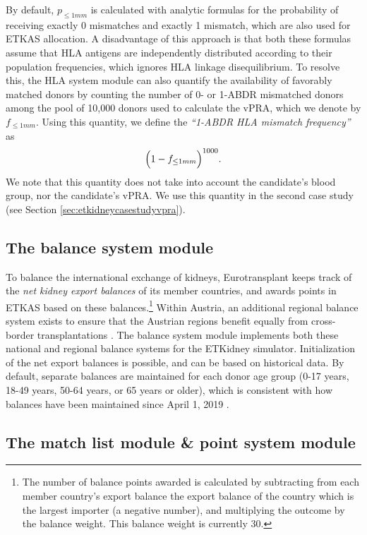 \documentclass[11pt,twoside,]{book}
\let\rmarkdownfootnote\footnote%
\def\footnote{\protect\rmarkdownfootnote}
\begin{document}
By default, \(p_{\leq1mm}\) is calculated with analytic formulas for the probability of
receiving exactly 0 mismatches and exactly 1 mismatch, which are also used for ETKAS
allocation. A disadvantage of this approach is that both these formulas assume
that HLA antigens are independently distributed according to their population
frequencies, which ignores HLA linkage disequilibrium. To resolve this, the
HLA system module can also quantify the availability of favorably matched donors
by counting the number of 0- or 1-ABDR mismatched donors among the pool of 10,000
donors used to calculate the vPRA, which we denote by \(f_{\leq1mm}\). Using this
quantity, we define the \emph{``1-ABDR HLA mismatch frequency''} as
\[\Bigl(1- f_{\leq1mm}\Bigr)^{1000}.\] We note that this quantity does not
take into account the candidate's blood group, nor the candidate's vPRA.
We use this quantity in the second case study (see Section
\ref{sec:etkidneycasestudyvpra}).

\subsection{The balance system module}\label{sec:etkidneybalance}

To balance the international exchange of kidneys, Eurotransplant keeps track of
the \emph{net kidney export balances} of its member countries, and awards points in
ETKAS based on these balances.\footnote{The number of balance points awarded is calculated
  by subtracting from each member country's export balance the export balance of
  the country which is the largest importer (a negative number), and multiplying
  the outcome by the balance weight. This balance weight is currently 30.} Within Austria, an additional regional balance system
exists to ensure that the Austrian regions benefit equally from
cross-border transplantations \citep{manualKidney}. The balance system module
implements both these national and regional balance systems for the ETKidney
simulator. Initialization of the net export balances is possible, and can be based on
historical data. By default, separate balances are maintained for each donor
age group (0-17 years, 18-49 years, 50-64 years, or 65 years or older), which
is consistent with how balances have been maintained since April 1, 2019 \citep{manualKidney}.

\subsection{The match list module \& point system module}\label{sec:etkidneympmod}
\end{document}
